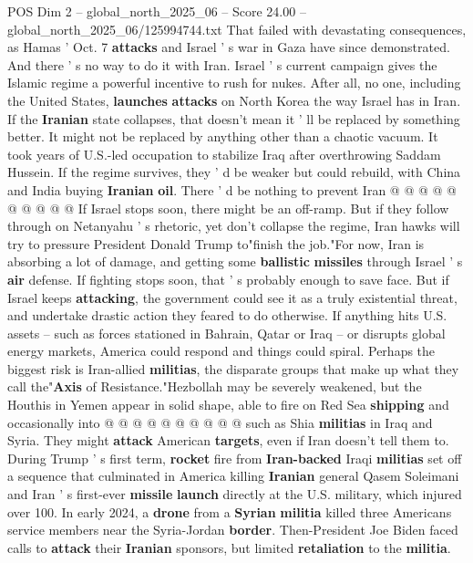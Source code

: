 \begin{textsample}{POS Dim 2 – global\_north\_2025\_06 – Score 24.00 – global\_north\_2025\_06/125994744.txt}
That failed with devastating consequences, as Hamas ' Oct. 7 \textbf{attacks} and Israel ' s war in Gaza have since demonstrated.
And there ' s no way to do it with Iran.
Israel ' s current campaign gives the Islamic regime a powerful incentive to rush for nukes.
After all, no one, including the United States, \textbf{launches} \textbf{attacks} on North Korea the way Israel has in Iran.
If the \textbf{Iranian} state collapses, that doesn't mean it ' ll be replaced by something better.
It might not be replaced by anything other than a chaotic vacuum.
It took years of U.S.-led occupation to stabilize Iraq after overthrowing Saddam Hussein.
If the regime survives, they ' d be weaker but could rebuild, with China and India buying \textbf{Iranian} \textbf{oil}.
There ' d be nothing to prevent Iran @ @ @ @ @ @ @ @ @ @ If Israel stops soon, there might be an off-ramp.
But if they follow through on Netanyahu ' s rhetoric, yet don't collapse the regime, Iran hawks will try to pressure President Donald Trump to"finish the job."For now, Iran is absorbing a lot of damage, and getting some \textbf{ballistic} \textbf{missiles} through Israel ' s \textbf{air} defense.
If fighting stops soon, that ' s probably enough to save face.
But if Israel keeps \textbf{attacking}, the government could see it as a truly existential threat, and undertake drastic action they feared to do otherwise.
If anything hits U.S. assets -- such as forces stationed in Bahrain, Qatar or Iraq -- or disrupts global energy markets, America could respond and things could spiral.
Perhaps the biggest risk is Iran-allied \textbf{militias}, the disparate groups that make up what they call the"\textbf{Axis} of Resistance."Hezbollah may be severely weakened, but the Houthis in Yemen appear in solid shape, able to fire on Red Sea \textbf{shipping} and occasionally into @ @ @ @ @ @ @ @ @ @ such as Shia \textbf{militias} in Iraq and Syria.
They might \textbf{attack} American \textbf{targets}, even if Iran doesn't tell them to.
During Trump ' s first term, \textbf{rocket} fire from \textbf{Iran-backed} Iraqi \textbf{militias} set off a sequence that culminated in America killing \textbf{Iranian} general Qasem Soleimani and Iran ' s first-ever \textbf{missile} \textbf{launch} directly at the U.S. military, which injured over 100.
In early 2024, a \textbf{drone} from a \textbf{Syrian} \textbf{militia} killed three Americans service members near the Syria-Jordan \textbf{border}.
Then-President Joe Biden faced calls to \textbf{attack} their \textbf{Iranian} sponsors, but limited \textbf{retaliation} to the \textbf{militia}.

\end{textsample}
